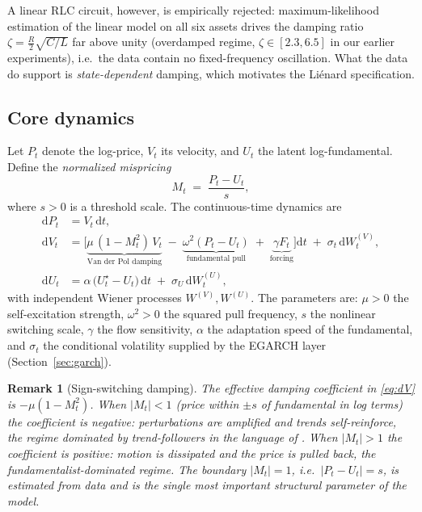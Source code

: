 \documentclass[11pt,a4paper]{article}
\newtheorem{remark}{Remark}
\newcommand{\dd}{\mathrm{d}}
\begin{document}
A linear RLC circuit, however, is empirically rejected: maximum-likelihood estimation of the linear model on all six assets drives the damping ratio $\zeta = \tfrac{R}{2}\sqrt{C/L}$ far above unity (overdamped regime, $\zeta \in [2.3, 6.5]$ in our earlier experiments), i.e.\ the data contain no fixed-frequency oscillation. What the data do support is \emph{state-dependent} damping, which motivates the Li\'enard specification.

\subsection{Core dynamics}

Let $P_t$ denote the log-price, $V_t$ its velocity, and $U_t$ the latent log-fundamental. Define the \emph{normalized mispricing}
\begin{equation}
M_t \;=\; \frac{P_t - U_t}{s},
\end{equation}
where $s>0$ is a threshold scale. The continuous-time dynamics are
\begin{align}
\dd P_t &= V_t\,\dd t, \label{eq:dP}\\[2pt]
\dd V_t &= \Big[\underbrace{\mu\,(1 - M_t^2)\,V_t}_{\text{Van der Pol damping}}
\;-\; \underbrace{\omega^2 (P_t - U_t)}_{\text{fundamental pull}}
\;+\; \underbrace{\gamma F_t}_{\text{forcing}}\Big]\dd t
\;+\; \sigma_t\,\dd W_t^{(V)}, \label{eq:dV}\\[2pt]
\dd U_t &= \alpha\,\big(U^{\star}_t - U_t\big)\,\dd t \;+\; \sigma_U\,\dd W_t^{(U)}, \label{eq:dU}
\end{align}
with independent Wiener processes $W^{(V)}, W^{(U)}$. The parameters are: $\mu > 0$ the self-excitation strength, $\omega^2 > 0$ the squared pull frequency, $s$ the nonlinear switching scale, $\gamma$ the flow sensitivity, $\alpha$ the adaptation speed of the fundamental, and $\sigma_t$ the conditional volatility supplied by the EGARCH layer (Section~\ref{sec:garch}).

\begin{remark}[Sign-switching damping]
The effective damping coefficient in \eqref{eq:dV} is $-\mu(1 - M_t^2)$. When $|M_t| < 1$ (price within $\pm s$ of fundamental in log terms) the coefficient is \emph{negative}: perturbations are amplified and trends self-reinforce, the regime dominated by trend-followers in the language of \citet{majewski2020co}. When $|M_t| > 1$ the coefficient is \emph{positive}: motion is dissipated and the price is pulled back, the fundamentalist-dominated regime. The boundary $|M_t| = 1$, i.e.\ $|P_t - U_t| = s$, is estimated from data and is the single most important structural parameter of the model.
\end{remark}
\end{document}

